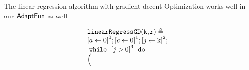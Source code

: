 %
\begin{example}
\label{ex:linearregression}
    The linear regression algorithm with gradient decent Optimization works well 
    in our $\textsf{AdaptFun}$ as well.
\begin{figure}
\centering
\begin{subfigure}{0.8\textwidth}
    \centering
    {\small
        \[
        \begin{array}{l}
            \kw{linearRegressGD(k, r)} \triangleq \\
                   \clabel{ a \leftarrow 0}^{0} ; 
                   \clabel{ c \leftarrow 0}^{1} ; 
                    \clabel{\assign{j}{\kw{k}} }^{2} ; \\
                    \ewhile ~ \clabel{j > 0}^{3} ~ \edo ~ \\
                    \Big(

\end{array}\]}
\end{subfigure}
\end{figure}
\end{example}
